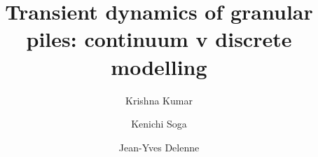 \documentclass[3p,times,procedia,number]{elsarticle}
\begin{document}
\begin{frontmatter}




\title{Transient dynamics of granular piles: continuum v discrete modelling}




\author[a]{Krishna Kumar}
\author[a,b]{Kenichi Soga}
\author[c]{Jean-Yves Delenne}

\address[a]{Department of Engineering, University of Cambridge, Cambridge CB2 1PZ, UK}
\address[b]{Department of Civil Engineering, University of California, Berkeley, USA}
\address[c]{University of Montpellier II, France}


\end{frontmatter}
\end{document}

